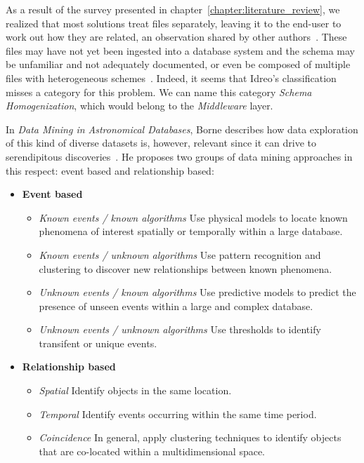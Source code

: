 As a result of the survey presented in chapter~\ref{chapter:literature_review},
we realized that most solutions treat files
separately, leaving it to the end-user to work out how they are related,
an observation shared by other authors~\cite{Silva2016}.
These files may have not yet been ingested into a database system and 
the schema may be unfamiliar and not adequately documented, or even be
composed of multiple files with heterogeneous schemes~\cite{alawini2016,zhang2015astronomy}.
Indeed, it seems that Idreo's classification misses a category for this problem.
We can name this category \emph{Schema Homogenization}, which would belong to
the \emph{Middleware} layer.

In \emph{Data Mining in Astronomical Databases}, Borne
describes how data exploration of this kind of diverse datasets is, however,
relevant since it can drive to serendipitous discoveries~\cite{Borne2001}. He proposes
two groups of data mining approaches in this respect: event
based and relationship based:

\begin{itemize}
    \item \textbf{Event based}
        \begin{itemize}
          \item \emph{Known events / known algorithms}
            Use physical models to locate known phenomena of interest spatially
            or temporally within a large database.
          \item \emph{Known events / unknown algorithms}
            Use pattern recognition and clustering to discover new relationships between known
            phenomena.
          \item \emph{Unknown events / known algorithms}
            Use predictive models to predict the presence of unseen events within a
            large and complex database.
          \item \emph{Unknown events / unknown algorithms}
            Use thresholds to identify transifent or unique events.
        \end{itemize}

    \item \textbf{Relationship based}
        \begin{itemize}
            \item \emph{Spatial}
                Identify objects in the same location.
            \item \emph{Temporal}
                Identify events occurring within the same time period.
            \item \emph{Coincidence}
                In general, apply clustering techniques to
                identify objects that are co-located within a multidimensional space.
        \end{itemize}
\end{itemize}

